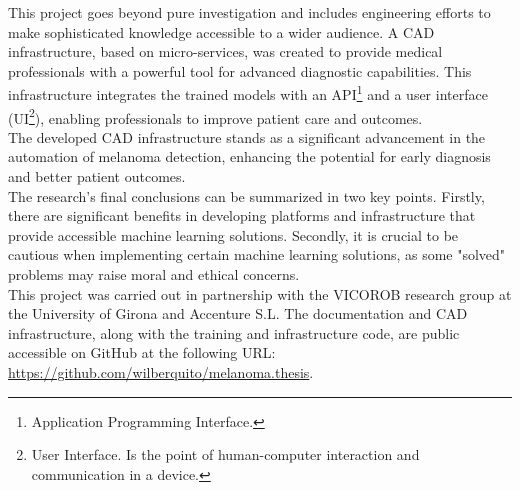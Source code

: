 This project goes beyond pure investigation and includes engineering efforts to
make sophisticated knowledge accessible to a wider audience. A CAD
infrastructure, based on micro-services, was created to provide medical
professionals with a powerful tool for advanced diagnostic capabilities. This
infrastructure integrates the trained models with an API\footnote{Application
Programming Interface.} and a user interface (UI\footnote{User Interface. Is
  the point of human-computer interaction and communication in a device.}),
  enabling professionals to improve patient care and outcomes. \\

The developed CAD infrastructure stands as a significant advancement in the
automation of melanoma detection, enhancing the potential for early diagnosis
and better patient outcomes. \\

The research's final conclusions can be summarized in two key points. Firstly,
there are significant benefits in developing platforms and infrastructure that
provide accessible machine learning solutions. Secondly, it is crucial to be
cautious when implementing certain machine learning solutions, as some "solved"
problems may raise moral and ethical concerns. \\

This project was carried out in partnership with the VICOROB
research group at the University of Girona and Accenture S.L. The documentation
and CAD infrastructure, along with the training and infrastructure code, are
public accessible on GitHub at the following URL:
\url{https://github.com/wilberquito/melanoma.thesis}.
